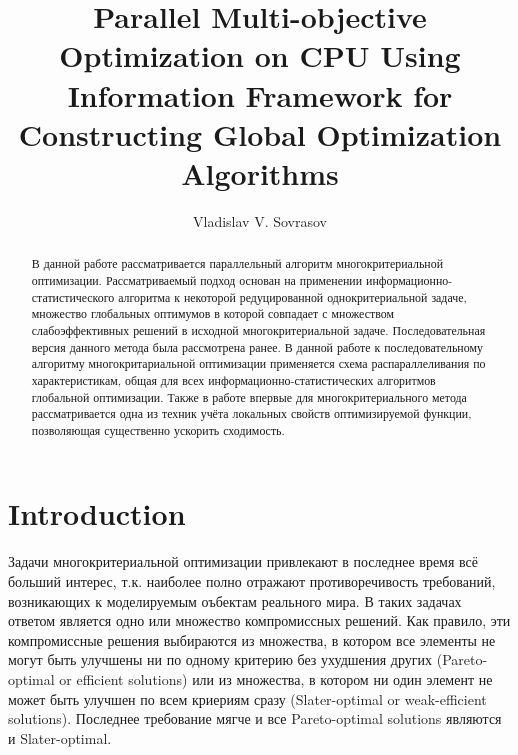 \documentclass{llncs}
\begin{document}
%
\mainmatter              %
%
\title{Parallel Multi-objective Optimization on CPU Using Information Framework for Constructing Global Optimization Algorithms}
%
%
\author{Vladislav V. Sovrasov}
%
%
%

\maketitle              %

\begin{abstract}
В данной работе рассматривается параллельный алгоритм многокритериальной оптимизации. Рассматриваемый подход основан на применении информационно-статистического алгоритма к некоторой редуцированной однокритериальной задаче, множество глобальных оптимумов в которой совпадает с множеством слабоэффективных решений в исходной многокритериальной задаче. Последовательная версия данного метода была рассмотрена ранее. В данной работе к последовательному алгоритму многокритариальной оптимизации применяется схема распараллеливания по характеристикам, общая для всех информационно-статистических алгоритмов глобальной оптимизации. Также в работе впервые для многокритериального метода рассматривается одна из техник учёта локальных свойств оптимизируемой функции, позволяющая существенно ускорить сходимость.

\end{abstract}
%
\section{Introduction}
Задачи многокритериальной оптимизации привлекают в последнее время всё больший интерес, т.к. наиболее полно отражают противоречивость требований, возникающих к моделируемым оъбектам реального мира. В таких задачах ответом является одно или множество компромиссных решений. Как правило, эти компромиссные решения выбираются из множества, в котором все элементы не могут быть улучшены ни по одному критерию без ухудшения других (Pareto-optimal or efficient solutions) или из множества, в котором ни один элемент не может быть улучшен по всем криериям сразу (Slater-optimal or weak-efficient solutions). Последнее требование мягче и все Pareto-optimal solutions являются и Slater-optimal.
\end{document}
